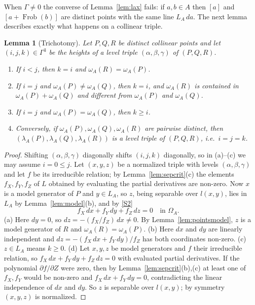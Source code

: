 \documentclass[11pt]{amsart}
\newtheorem{lemma}[theorem]{Lemma}
\theoremstyle{definition}
\theoremstyle{remark}
\newcommand{\Frob}{\operatorname{Frob}}
\begin{document}
When $\Gamma\neq0$ the converse of Lemma~\ref{lem:lax} fails: if $a,b\in A$ then $[a]$ and $[a+\Frob(b)]$ are distinct points with the same line $L_A\,da$.
The next lemma describes exactly what happens on a collinear triple.

\begin{lemma}[Trichotomy]\label{lem:trichotomy}
Let $P,Q,R$ be distinct collinear points and let $(i,j,k)\in\Gamma^3$ be the heights of a level triple $(\alpha,\beta,\gamma)$ of $(P,Q,R)$.
\begin{enumerate}[label=\textup{(\alph*)}]
\item If $i<j$, then $k=i$ and $\omega_A(R)=\omega_A(P)$.
\item If $i=j$ and $\omega_A(P)\neq\omega_A(Q)$, then $k=i$, and $\omega_A(R)$ is contained in $\omega_A(P)+\omega_A(Q)$ and different from $\omega_A(P)$ and $\omega_A(Q)$.
\item If $i=j$ and $\omega_A(P)=\omega_A(Q)$, then $k\ge i$.
\item Conversely, if $\omega_A(P),\omega_A(Q),\omega_A(R)$ are pairwise distinct, then $(\lambda_A(P),\lambda_A(Q),\lambda_A(R))$ is a level triple of $(P,Q,R)$, i.e.\ $i=j=k$.
\end{enumerate}
\end{lemma}

\begin{proof}
Shifting $(\alpha,\beta,\gamma)$ diagonally shifts $(i,j,k)$ diagonally, so in (a)--(c) we may assume $i=0\le j$. Let $(x,y,z)$ be a normalized triple with levels $(\alpha,\beta,\gamma)$ and let $f$ be its irreducible relation;
by Lemma~\ref{lem:sepcrit}(c) the elements $f_X,f_Y,f_Z$ of $L$ obtained by evaluating the partial derivatives are non-zero.
Now $x$ is a model generator of $P$ and $y\in L_A$, so $z$, being separable over $l(x,y)$, lies in $L_A$ by Lemma~\ref{lem:model}(b), and by \ref{S2}
\[ f_X\,dx+f_Y\,dy+f_Z\,dz=0\quad\text{in }\Omega_A. \]
(a) Here $dy=0$, so $dz=-(f_X/f_Z)\,dx\ne0$. By Lemma~\ref{lem:pointsmodel}, $z$ is a model generator of $R$ and $\omega_A(R)=\omega_A(P)$.
(b) Here $dx$ and $dy$ are linearly independent and $dz=-(f_X\,dx+f_Y\,dy)/f_Z$ has both coordinates non-zero.
(c) $z\in L_A$ means $k\ge0$.
(d) Let $x,y,z$ be model generators and $f$ their irreducible relation, so $f_X\,dx+f_Y\,dy+f_Z\,dz=0$ with evaluated partial derivatives.
If the polynomial $\partial f/\partial Z$ were zero, then by Lemma~\ref{lem:sepcrit}(b),(c) at least one of $f_X,f_Y$ would be non-zero and $f_X\,dx+f_Y\,dy=0$, contradicting the linear independence of $dx$ and $dy$.
So $z$ is separable over $l(x,y)$; by symmetry $(x,y,z)$ is normalized.
\end{proof}
\end{document}
